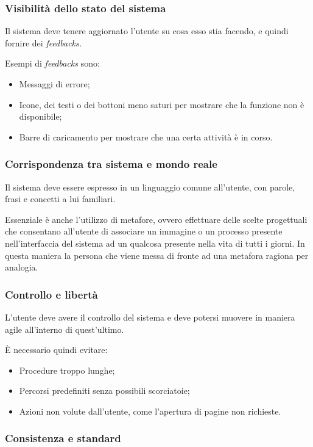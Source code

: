 \hypertarget{visibilituxe0-dello-stato-del-sistema}{%
\subsubsection{Visibilità dello stato del sistema}\label{visibilituxe0-dello-stato-del-sistema}}

Il sistema deve tenere aggiornato l'utente su cosa esso stia facendo, e quindi fornire dei \emph{feedbacks.}

Esempi di \emph{feedbacks} sono:

\begin{itemize}
    \item Messaggi di errore;
    \item Icone, dei testi o dei bottoni meno saturi per mostrare che la funzione non è disponibile;
    \item Barre di caricamento per mostrare che una certa attività è in corso.
\end{itemize}
\hypertarget{corrispondenza-tra-sistema-e-mondo-reale}{%
\subsubsection{Corrispondenza tra sistema e mondo reale}\label{corrispondenza-tra-sistema-e-mondo-reale}}

Il sistema deve essere espresso in un linguaggio comune all'utente, con parole, frasi e concetti a lui familiari.

Essenziale è anche l'utilizzo di metafore, ovvero effettuare delle scelte progettuali che consentano all'utente di associare un immagine o un processo presente nell'interfaccia del sistema ad un qualcosa presente nella vita di tutti i giorni. In questa maniera la persona che viene messa di fronte ad una metafora ragiona per analogia.


\hypertarget{controllo-e-libertuxe0}{%
\subsubsection{Controllo e libertà}\label{controllo-e-libertuxe0}}

L'utente deve avere il controllo del sistema e deve potersi muovere in maniera agile all'interno di quest'ultimo.

È necessario quindi evitare:

\begin{itemize}
    \item Procedure troppo lunghe;
    \item Percorsi predefiniti senza possibili scorciatoie;
    \item Azioni non volute dall'utente, come l'apertura di pagine non richieste.
\end{itemize}
\hypertarget{consistenza-e-standard}{%
\subsubsection{Consistenza e standard}\label{consistenza-e-standard}}

